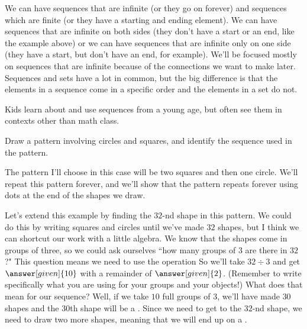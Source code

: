 \documentclass{ximera}
\begin{document}
We can have sequences that are infinite (or they go on forever) and sequences which are finite (or they have a starting and ending element). We can have sequences that are infinite on both sides (they don't have a start or an end, like the example above) or we can have sequences that are infinite only on one side (they have a start, but don't have an end, for example). We'll be focused mostly on sequences that are infinite because of the connections we want to make later. Sequences and sets have a lot in common, but the big difference is that the elements in a sequence come in a specific order and the elements in a set do not.

Kids learn about and use sequences from a young age, but often see them in contexts other than math class.
\begin{example}
Draw a pattern involving circles and squares, and identify the sequence used in the pattern.

The pattern I'll choose in this case will be two squares and then one circle. We'll repeat this pattern forever, and we'll show that the pattern repeats forever using dots at the end of the shapes we draw.
\begin{image}
\end{image}
Let's extend this example by finding the $32$-nd shape in this pattern. We could do this by writing squares and circles until we've made $32$ shapes, but I think we can shortcut our work with a little algebra. We know that the shapes come in groups of three, so we could ask ourselves ``how many groups of $3$ are there in $32$?" This question means we need to use the operation  So we'll take $32 \div 3$ and get $\answer[given]{10}$ with a remainder of $\answer[given]{2}$. (Remember to write specifically what you are using for your groups and your objects!) What does that mean for our sequence? Well, if we take $10$ full groups of $3$, we'll have made $30$ shapes and the $30$th shape will be a . Since we need to get to the $32$-nd shape, we need to draw two more shapes, meaning that we will end up on a  .
\end{example}
\end{document}
